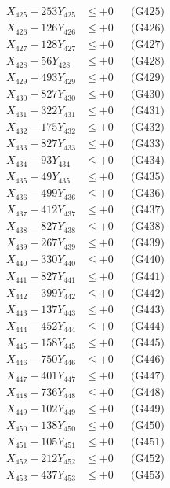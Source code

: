 \documentclass[a4paper,10pt]{article}
\begin{document}
{\begin{align}
X_{425} - 253Y_{425} &\leq +0 && \text{(G425)} \\
X_{426} - 126Y_{426} &\leq +0 && \text{(G426)} \\
X_{427} - 128Y_{427} &\leq +0 && \text{(G427)} \\
X_{428} - 56Y_{428} &\leq +0 && \text{(G428)} \\
X_{429} - 493Y_{429} &\leq +0 && \text{(G429)} \\
X_{430} - 827Y_{430} &\leq +0 && \text{(G430)} \\
\allowbreak
X_{431} - 322Y_{431} &\leq +0 && \text{(G431)} \\
X_{432} - 175Y_{432} &\leq +0 && \text{(G432)} \\
X_{433} - 827Y_{433} &\leq +0 && \text{(G433)} \\
X_{434} - 93Y_{434} &\leq +0 && \text{(G434)} \\
X_{435} - 49Y_{435} &\leq +0 && \text{(G435)} \\
X_{436} - 499Y_{436} &\leq +0 && \text{(G436)} \\
X_{437} - 412Y_{437} &\leq +0 && \text{(G437)} \\
X_{438} - 827Y_{438} &\leq +0 && \text{(G438)} \\
X_{439} - 267Y_{439} &\leq +0 && \text{(G439)} \\
X_{440} - 330Y_{440} &\leq +0 && \text{(G440)} \\
\allowbreak
X_{441} - 827Y_{441} &\leq +0 && \text{(G441)} \\
X_{442} - 399Y_{442} &\leq +0 && \text{(G442)} \\
X_{443} - 137Y_{443} &\leq +0 && \text{(G443)} \\
X_{444} - 452Y_{444} &\leq +0 && \text{(G444)} \\
X_{445} - 158Y_{445} &\leq +0 && \text{(G445)} \\
X_{446} - 750Y_{446} &\leq +0 && \text{(G446)} \\
X_{447} - 401Y_{447} &\leq +0 && \text{(G447)} \\
X_{448} - 736Y_{448} &\leq +0 && \text{(G448)} \\
X_{449} - 102Y_{449} &\leq +0 && \text{(G449)} \\
X_{450} - 138Y_{450} &\leq +0 && \text{(G450)} \\
\allowbreak
X_{451} - 105Y_{451} &\leq +0 && \text{(G451)} \\
X_{452} - 212Y_{452} &\leq +0 && \text{(G452)} \\
X_{453} - 437Y_{453} &\leq +0 && \text{(G453)} \\

\end{align}}
\end{document}
